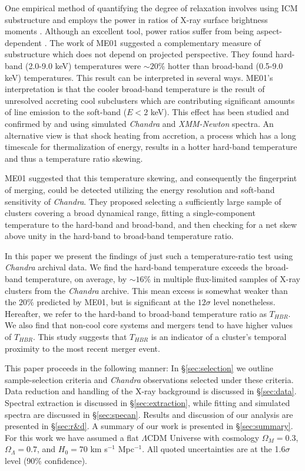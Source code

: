 \documentclass[12pt,preprint]{aastex}
\begin{document}
One empirical method of quantifying the degree of relaxation involves
using ICM substructure and employs the power in ratios of X-ray surface
brightness moments \citep{1995ApJ...452..522B, 1996ApJ...458...27B,
2005ApJ...624..606J}. Although an excellent tool, power ratios suffer
from being aspect-dependent \citep{2007arXiv0708.1518J, VV08}. The
work of ME01 suggested a complementary measure of substructure which
does not depend on projected perspective. They found hard-band
(2.0-9.0 keV) temperatures were $\sim 20\%$ hotter than broad-band
(0.5-9.0 keV) temperatures. This result can be interpreted in several
ways. ME01's interpretation is that the cooler broad-band temperature is
the result of unresolved accreting cool subclusters which are contributing
significant amounts of line emission to the soft-band ($E < 2$
keV). This effect has been studied and confirmed by
\cite{2004MNRAS.354...10M} and \cite{2006ApJ...640..710V} using
simulated {\it Chandra} and {\it{XMM-Newton}} spectra. An alternative
view is that shock heating from accretion, a process which has a long
timescale for thermalization of energy, results in a hotter
hard-band temperature and thus a temperature ratio skewing.

ME01 suggested that this temperature skewing, and consequently the
fingerprint of merging, could be detected utilizing the energy
resolution and soft-band sensitivity of {\it Chandra}. They proposed
selecting a sufficiently large sample of clusters covering a broad
dynamical range, fitting a single-component temperature to the
hard-band and broad-band, and then checking for a net skew above unity
in the hard-band to broad-band temperature ratio.

In this paper we present the findings of just such a temperature-ratio
test using {\it Chandra} archival data. We find the hard-band
temperature exceeds the broad-band temperature, on average, by
$\sim16\%$ in multiple flux-limited samples of X-ray clusters from the
{\it Chandra} archive. This mean excess is somewhat weaker than the
$20\%$ predicted by ME01, but is significant at the $12\sigma$ level
nonetheless. Hereafter, we refer to the hard-band to broad-band
temperature ratio as $T_{HBR}$. We also find that non-cool core
systems and mergers tend to have higher values of $T_{HBR}$. This
study suggests that $T_{HBR}$ is an indicator of a cluster's temporal
proximity to the most recent merger event.

This paper proceeds in the following manner:
In \S\ref{sec:selection} we outline sample-selection criteria and {\it
Chandra} observations selected under these criteria. Data reduction
and handling of the X-ray background is discussed in
\S\ref{sec:data}. Spectral extraction is discussed in
\S\ref{sec:extraction}, while fitting and simulated spectra are
discussed in \S\ref{sec:specan}. Results and discussion of our
analysis are presented in \S\ref{sec:r&d}. A summary of our work is
presented in \S\ref{sec:summary}. For this work we have assumed a flat
$\Lambda$CDM Universe with cosmology $\Omega_{M} = 0.3$,
$\Omega_{\Lambda} = 0.7$, and $H_{0} = 70$ km s$^{-1}$ Mpc$^{-1}$. All
quoted uncertainties are at the 1.6$\sigma$ level (90\% confidence).
\end{document}
